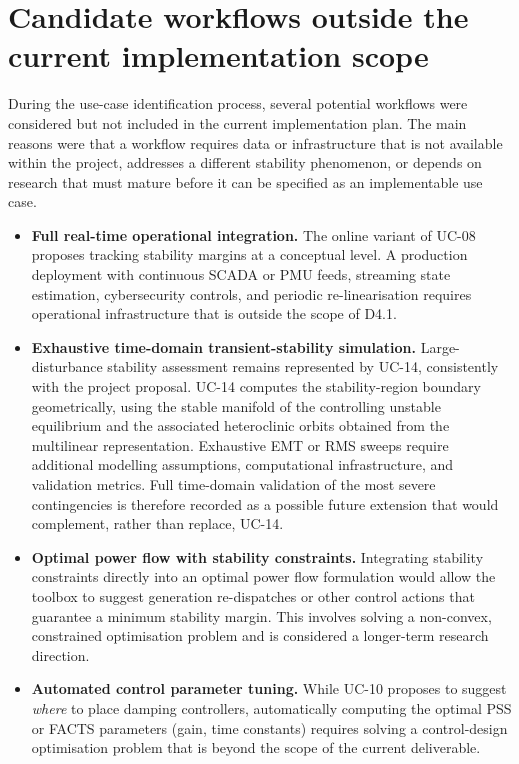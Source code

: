 

\section{Candidate workflows outside the current implementation scope}
During the use-case identification process, several potential workflows were considered but not included in the current implementation plan. The main reasons were that a workflow requires data or infrastructure that is not available within the project, addresses a different stability phenomenon, or depends on research that must mature before it can be specified as an implementable use case.

\begin{itemize}
  \item \textbf{Full real-time operational integration.} The online variant of UC-08 proposes tracking stability margins at a conceptual level. A production deployment with continuous SCADA or PMU feeds, streaming state estimation, cybersecurity controls, and periodic re-linearisation requires operational infrastructure that is outside the scope of D4.1.

  \item \textbf{Exhaustive time-domain transient-stability simulation.} Large-disturbance stability assessment remains represented by UC-14, consistently with the project proposal. UC-14 computes the stability-region boundary geometrically, using the stable manifold of the controlling unstable equilibrium and the associated heteroclinic orbits obtained from the multilinear representation. Exhaustive EMT or RMS sweeps require additional modelling assumptions, computational infrastructure, and validation metrics. Full time-domain validation of the most severe contingencies is therefore recorded as a possible future extension that would complement, rather than replace, UC-14.

  \item \textbf{Optimal power flow with stability constraints.} Integrating stability constraints directly into an optimal power flow formulation would allow the toolbox to suggest generation re-dispatches or other control actions that guarantee a minimum stability margin. This involves solving a non-convex, constrained optimisation problem and is considered a longer-term research direction.

  \item \textbf{Automated control parameter tuning.} While UC-10 proposes to suggest \textit{where} to place damping controllers, automatically computing the optimal PSS or FACTS parameters (gain, time constants) requires solving a control-design optimisation problem that is beyond the scope of the current deliverable.


\end{itemize}
